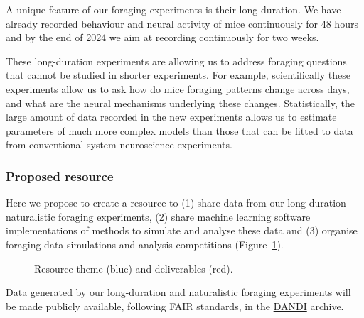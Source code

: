 A unique feature of our foraging experiments is their long duration. We have
already recorded behaviour and neural activity of mice continuously for 48 hours
and by the end of 2024 we aim at recording continuously for two weeks.

These long-duration experiments are allowing us to address foraging questions
that cannot be studied in shorter experiments. For example, scientifically
these experiments allow us to ask how do mice foraging patterns change across
days, and what are the neural mechanisms underlying these changes.
Statistically, the large amount of data recorded in the new experiments allows
us to estimate parameters of much more complex models than those that can be
fitted to data from conventional system neuroscience experiments.



\subsubsection*{Proposed resource}

Here we propose to create a resource to (1) share data from our long-duration
naturalistic foraging experiments, (2) share machine learning software
implementations of methods to simulate and analyse these data and (3) organise
foraging data simulations and analysis competitions (Figure~\ref{fig:resource}).

\begin{figure}
    \begin{center}
        
    \end{center}
    \caption{Resource theme (blue) and deliverables (red).}
    \label{fig:resource}
\end{figure}

Data generated by our long-duration and naturalistic foraging experiments will
be made publicly available, following FAIR standards, in the
\href{https://dandiarchive.org/}{DANDI} archive.

